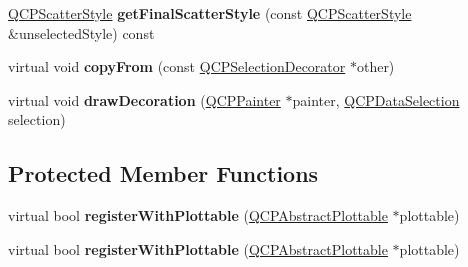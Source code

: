 \begin{DoxyCompactItemize}
\item 
\hyperlink{class_q_c_p_scatter_style}{Q\+C\+P\+Scatter\+Style} {\bfseries get\+Final\+Scatter\+Style} (const \hyperlink{class_q_c_p_scatter_style}{Q\+C\+P\+Scatter\+Style} \&unselected\+Style) const \hypertarget{class_q_c_p_selection_decorator_aa0c630c41103809985f41b3b81b0c308}{}\label{class_q_c_p_selection_decorator_aa0c630c41103809985f41b3b81b0c308}

\item 
virtual void {\bfseries copy\+From} (const \hyperlink{class_q_c_p_selection_decorator}{Q\+C\+P\+Selection\+Decorator} $\ast$other)\hypertarget{class_q_c_p_selection_decorator_a06f487bf8fb0047f2ba3b6c3f63f80b3}{}\label{class_q_c_p_selection_decorator_a06f487bf8fb0047f2ba3b6c3f63f80b3}

\item 
virtual void {\bfseries draw\+Decoration} (\hyperlink{class_q_c_p_painter}{Q\+C\+P\+Painter} $\ast$painter, \hyperlink{class_q_c_p_data_selection}{Q\+C\+P\+Data\+Selection} selection)\hypertarget{class_q_c_p_selection_decorator_a52954b804ad581b5dedb9c331306b932}{}\label{class_q_c_p_selection_decorator_a52954b804ad581b5dedb9c331306b932}

\end{DoxyCompactItemize}
\subsection*{Protected Member Functions}
\begin{DoxyCompactItemize}
\item 
virtual bool {\bfseries register\+With\+Plottable} (\hyperlink{class_q_c_p_abstract_plottable}{Q\+C\+P\+Abstract\+Plottable} $\ast$plottable)\hypertarget{class_q_c_p_selection_decorator_af66cb39e308da0285ae5d533e1e85027}{}\label{class_q_c_p_selection_decorator_af66cb39e308da0285ae5d533e1e85027}

\item 
virtual bool {\bfseries register\+With\+Plottable} (\hyperlink{class_q_c_p_abstract_plottable}{Q\+C\+P\+Abstract\+Plottable} $\ast$plottable)\hypertarget{class_q_c_p_selection_decorator_a13dd7ec86c3159eea76c2eb293b99213}{}\label{class_q_c_p_selection_decorator_a13dd7ec86c3159eea76c2eb293b99213}

\end{DoxyCompactItemize}

